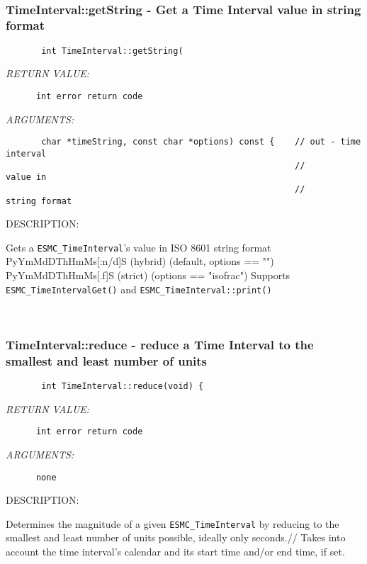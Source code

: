 \mbox{}\hrulefill\ 
 
\subsubsection [TimeInterval::getString] {TimeInterval::getString - Get a Time Interval value in string format}


  
\begin{verbatim}       int TimeInterval::getString(\end{verbatim}{\em RETURN VALUE:}
\begin{verbatim}      int error return code\end{verbatim}{\em ARGUMENTS:}
\begin{verbatim}       char *timeString, const char *options) const {    // out - time interval
                                                         //       value in
                                                         //       string format\end{verbatim}
{\sf DESCRIPTION:\\ }


        Gets a {\tt ESMC\_TimeInterval}'s value in ISO 8601 string format
        PyYmMdDThHmMs[:n/d]S (hybrid) (default, options == "")
        PyYmMdDThHmMs[.f]S   (strict) (options == "isofrac")
        Supports {\tt ESMC\_TimeIntervalGet()} and
                 {\tt ESMC\_TimeInterval::print()}
   
 
\mbox{}\hrulefill\ 
 
\subsubsection [TimeInterval::reduce] {TimeInterval::reduce - reduce a Time Interval to the smallest and least number of units}


  
\begin{verbatim}       int TimeInterval::reduce(void) {\end{verbatim}{\em RETURN VALUE:}
\begin{verbatim}      int error return code\end{verbatim}{\em ARGUMENTS:}
\begin{verbatim}      none\end{verbatim}
{\sf DESCRIPTION:\\ }


       Determines the magnitude of a given {\tt ESMC\_TimeInterval} by reducing
       to the smallest and least number of units possible, ideally only seconds.//     Takes into account the time interval's calendar and its start time
       and/or end time, if set.
  
\setlength{\parskip}{\oldparskip}
\setlength{\parindent}{\oldparindent}
\setlength{\baselineskip}{\oldbaselineskip}
